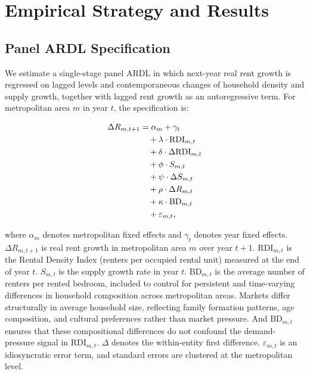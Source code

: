 \documentclass[pdflatex,sn-basic]{sn-jnl}%
\theoremstyle{thmstyleone}%
\theoremstyle{thmstyletwo}%
\theoremstyle{thmstylethree}%
\begin{document}
\section{Empirical Strategy and Results}\label{section4}
\subsection{Panel ARDL Specification}\label{ardl_specification}

We estimate a single-stage panel ARDL in which next-year real rent growth is 
regressed on lagged levels and contemporaneous changes of household density and 
supply growth, together with lagged rent growth as an autoregressive term. For 
metropolitan area $m$ in year $t$, the specification is:

\begin{align}
\Delta R_{m,t+1} &= \alpha_m + \gamma_t \notag \\
&\quad + \lambda \cdot \text{RDI}_{m,t} \notag \\
&\quad + \delta \cdot \Delta\text{RDI}_{m,t} \notag \\
&\quad + \phi \cdot S_{m,t} \notag \\
&\quad + \psi \cdot \Delta S_{m,t} \notag \\
&\quad + \rho \cdot \Delta R_{m,t} \notag \\
&\quad + \kappa \cdot \text{BD}_{m,t} \notag \\
&\quad + \varepsilon_{m,t},
\end{align}

where $\alpha_m$ denotes metropolitan fixed effects and $\gamma_t$ denotes year
fixed effects. $\Delta R_{m,t+1}$ is real rent growth in metropolitan area $m$
over year $t+1$. $\text{RDI}_{m,t}$ is the Rental Density Index (renters per
occupied rental unit) measured at the end of year $t$. $S_{m,t}$ is the supply
growth rate in year $t$. $\text{BD}_{m,t}$ is the average number of renters per
rented bedroom, included to control for persistent and time-varying differences
in household composition across metropolitan areas. Markets differ structurally
in average household size, reflecting family formation patterns, age composition,
and cultural preferences rather than market pressure. And $\text{BD}_{m,t}$
ensures that these compositional differences do not confound the demand-pressure
signal in $\text{RDI}_{m,t}$. $\Delta$ denotes the within-entity first difference.
$\varepsilon_{m,t}$ is an idiosyncratic error term, and standard errors are
clustered at the metropolitan level.
\end{document}
